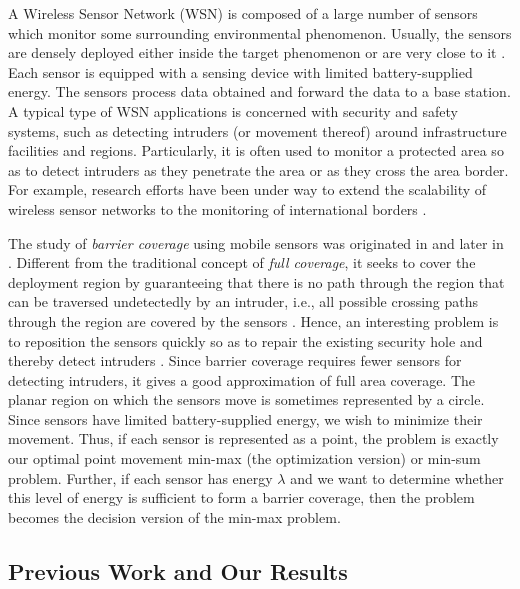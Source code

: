\documentclass[11pt]{article}
\begin{document}
A Wireless Sensor Network (WSN) is composed of a large number of
sensors which monitor some surrounding environmental phenomenon.
Usually, the sensors are densely deployed either inside the target phenomenon or
are very close to it \cite{ref:AkyildizWi02}. Each sensor
is equipped with a sensing device
with limited battery-supplied energy.
The sensors process data obtained and forward the data to a base station.
A typical type of WSN applications
is concerned with security and safety systems, such as detecting intruders
(or movement thereof) around infrastructure facilities and regions. Particularly,
it is often used to monitor a protected area so as to detect intruders
as they penetrate the area or as they cross the area border. For example, research
efforts have been under way to extend the scalability of wireless sensor networks
to the monitoring of international borders \cite{ref:Hu08,ref:KumarBa07}.

The study of {\it barrier coverage} using mobile sensors was originated
in \cite{ref:ChenDe07,ref:KumarBa07} and later in \cite{ref:BhattacharyaOp09}.
Different from the traditional concept of {\it full coverage},
it seeks to cover the deployment region by guaranteeing that there is no
path through the region that can be traversed undetectedly by an intruder,
i.e., all possible crossing paths through the region
are covered by the sensors \cite{ref:BhattacharyaOp09,ref:ChenDe07,ref:KumarBa07}.
Hence, an interesting problem is
to reposition the sensors quickly so as to repair the existing security hole and
thereby detect intruders \cite{ref:BhattacharyaOp09}. Since barrier coverage
requires fewer sensors for detecting intruders, it gives a good
approximation of full area coverage. The planar region on which the sensors move
is sometimes represented by a circle.
Since sensors have limited battery-supplied energy, we wish
to minimize their movement. Thus, if each sensor is
represented as a point, the problem is exactly our optimal point
movement min-max (the optimization version) or min-sum problem.
Further, if each sensor has energy $\lambda$ and we want to determine
whether this level of energy is sufficient to form a barrier coverage,
then the problem becomes the decision version of the min-max problem.





\subsection{Previous Work and Our Results}
\end{document}
